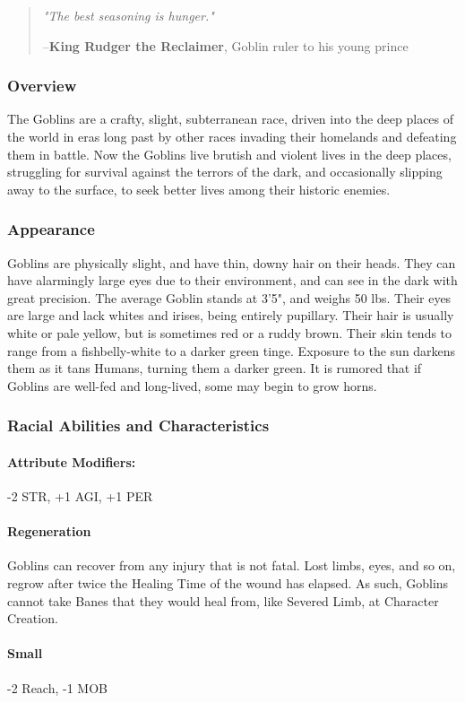 \documentclass[oneside,11pt,english]{book}
\begin{document}
\begin{quote} 
  \emph{"The best seasoning is hunger."}

  \hfill --\textbf{King Rudger the Reclaimer}, Goblin ruler to his young prince 
\end{quote}

\subsubsection*{Overview} 
The Goblins are a crafty, slight, subterranean race, driven into the deep places
of the world in eras long past by other races invading their homelands and
defeating them in battle. Now the Goblins live brutish and violent lives in the
deep places, struggling for survival against the terrors of the dark, and
occasionally slipping away to the surface, to seek better lives among their
historic enemies.  
\subsubsection*{Appearance} 
Goblins are physically slight, and have thin, downy hair on their heads. They
can have alarmingly large eyes due to their environment, and can see in the dark
with great precision. The average Goblin stands at 3'5", and weighs 50 lbs.
Their eyes are large and lack whites and irises, being entirely pupillary. Their
hair is usually white or pale yellow, but is sometimes red or a ruddy brown.
Their skin tends to range from a fishbelly-white to a darker green tinge.
Exposure to the sun darkens them as it tans Humans, turning them a darker green.
It is rumored that if Goblins are well-fed and long-lived, some may begin to
grow horns.
\subsubsection*{Racial Abilities and Characteristics} 
\paragraph{Attribute Modifiers:} -2 STR, +1 AGI, +1 PER 
\paragraph{Regeneration}
Goblins can recover from any injury that is not fatal. Lost limbs, eyes, and so
on, regrow after twice the Healing Time of the wound has elapsed. As such,
Goblins cannot take Banes that they would heal from, like Severed Limb, at
Character Creation.
\paragraph{Small}
-2 Reach, -1 MOB 
\end{document}
